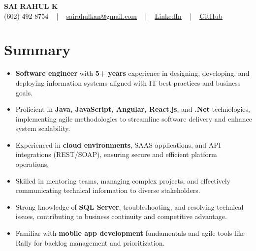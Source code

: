 \documentclass[letterpaper,11pt]{article}
\newcommand{\resumeItem}[1]{
  \item\footnotesize{
    {#1 \vspace{-2pt}}
  }
}
\newcommand{\resumeItemListStart}{\begin{itemize}[leftmargin=*]}
\newcommand{\resumeItemListEnd}{\end{itemize}\vspace{-5pt}}
\begin{document}
\begin{center}
    {\fontsize{14pt}{12pt}\selectfont \textbf{\MakeUppercase{Sai Rahul K}}}\\ \vspace{2pt}
    \fontsize{10pt}{12pt}\selectfont (602) 492-8754 ~ | ~ \href{mailto:sairahulkan@gmail.com}{sairahulkan@gmail.com} ~ | ~
    \href{https://www.linkedin.com/in/rq123/}{\color{blue}\underline{LinkedIn}} ~ | ~
    \href{https://github.com/kanrahuldo}{\color{blue}\underline{GitHub}}~
    \vspace{-8pt}
\end{center}

\section{Summary}
\fontsize{9pt}{10pt}\selectfont
\resumeItemListStart
    \resumeItem{\textbf{Software engineer} with \textbf{5+ years} experience in designing, developing, and deploying information systems aligned with IT best practices and business goals.} \vspace{-3pt}
    \resumeItem{Proficient in \textbf{Java, JavaScript, Angular, React.js}, and \textbf{.Net} technologies, implementing agile methodologies to streamline software delivery and enhance system scalability.} \vspace{-3pt}
    \resumeItem{Experienced in \textbf{cloud environments}, SAAS applications, and API integrations (REST/SOAP), ensuring secure and efficient platform operations.} \vspace{-3pt}
    \resumeItem{Skilled in mentoring teams, managing complex projects, and effectively communicating technical information to diverse stakeholders.} \vspace{-3pt}
    \resumeItem{Strong knowledge of \textbf{SQL Server}, troubleshooting, and resolving technical issues, contributing to business continuity and competitive advantage.} \vspace{-3pt}
    \resumeItem{Familiar with \textbf{mobile app development} fundamentals and agile tools like Rally for backlog management and prioritization.} \vspace{-3pt}
\resumeItemListEnd
\vspace{-6pt}
\end{document}
